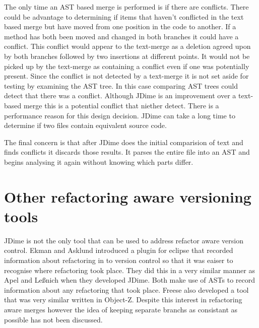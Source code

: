 The only time an AST based merge is performed is if there are conflicts.  There could be advantage to determining if items that haven't conflicted in the text based merge but have moved from one position in the code to another.  If a method has both been moved and changed in both branches it could have a conflict.  This conflict would appear to the text-merge as a deletion agreed upon by both branches followed by two insertions at different points.  It would not be picked up by the text-merge as containing a conflict even if one was potentially present.  Since the conflict is not detected by a text-merge it is not set aside for testing by examining the AST tree. In this case comparing AST trees could detect that there was a conflict. Although JDime is an improvement over a text-based merge this is a potential conflict that niether detect. There is a performance reason for this design decision. JDime can take a long time to determine if two files contain equivalent source code.

The final concern is that after JDime does the initial comparision of text and finds conflicts it discards those results. It parses the entire file into an AST and begins analysing it again without knowing which parts differ.   







\section{Other refactoring aware versioning tools}
JDime is not the only tool that can be used to address refactor aware version control.  Ekman and Asklund \cite{Ekman2004} introduced a plugin for eclipse that recorded information about refactoring in to version control so that it was eaiser to recognise where refactoring took place.  They did this in a very similar manner as Apel and Le{\ss}nich when they developed JDime.  Both make use of ASTs to record information about any refactoring that took place.  Freese \cite{Freese2006} also developed a tool that was very similar written in Object-Z. Despite this interest in refactoring aware merges however the idea of keeping separate branchs as consistant as possible has not been discussed.
 
 


